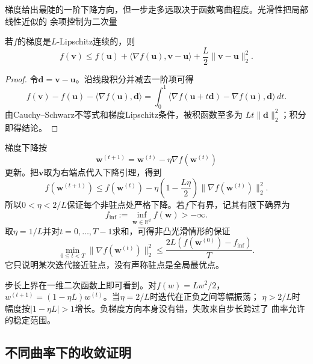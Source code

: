 梯度给出最陡的一阶下降方向，但一步走多远取决于函数弯曲程度。光滑性把局部线性近似的
余项控制为二次量

\begin{lemma}[下降引理]
\label{lem:opt-descent}
若$f$的梯度是$L$-Lipschitz连续的，则
\begin{equation}
  f(\bm{v})\leq f(\bm{u})
  +\langle\nabla f(\bm{u}),\bm{v}-\bm{u}\rangle
  +\frac{L}{2}\lVert\bm{v}-\bm{u}\rVert_2^2.
  \label{eq:opt-descent-lemma}
\end{equation}
\end{lemma}

\begin{proof}
令$\bm{d}=\bm{v}-\bm{u}$。沿线段积分并减去一阶项可得
\[
  f(\bm{v})-f(\bm{u})-\langle\nabla f(\bm{u}),\bm{d}\rangle
  =
  \int_0^1
  \langle\nabla f(\bm{u}+t\bm{d})-\nabla f(\bm{u}),\bm{d}\rangle\,dt.
\]
由Cauchy--Schwarz不等式和梯度Lipschitz条件，被积函数至多为
$Lt\lVert\bm{d}\rVert_2^2$；积分即得结论。
\end{proof}

梯度下降按
\begin{equation}
  \bm{w}^{(t+1)}
  =\bm{w}^{(t)}-\eta\nabla f(\bm{w}^{(t)})
  \label{eq:opt-gradient-descent}
\end{equation}
更新。把$\bm{v}$取为右端点代入下降引理，得到
\begin{equation}
  f(\bm{w}^{(t+1)})
  \leq f(\bm{w}^{(t)})
  -\eta\left(1-\frac{L\eta}{2}\right)
  \lVert\nabla f(\bm{w}^{(t)})\rVert_2^2.
  \label{eq:opt-gradient-single-step}
\end{equation}
所以$0<\eta<2/L$保证每个非驻点处严格下降。若$f$下有界，记其有限下确界为
\[
  f_{\inf}:=\inf_{\bm{w}\in\mathbb{R}^d}f(\bm{w})>-\infty.
\]
取$\eta=1/L$并对$t=0,\ldots,T-1$求和，可得非凸光滑情形的保证
\begin{equation}
  \min_{0\leq t<T}\lVert\nabla f(\bm{w}^{(t)})\rVert_2^2
  \leq
  \frac{2L(f(\bm{w}^{(0)})-f_{\inf})}{T}.
  \label{eq:opt-nonconvex-gradient-rate}
\end{equation}
它只说明某次迭代接近驻点，没有声称驻点是全局最优点。

步长上界在一维二次函数上即可看到。对$f(w)=Lw^2/2$，
$w^{(t+1)}=(1-\eta L)w^{(t)}$。当$\eta=2/L$时迭代在正负之间等幅振荡；
$\eta>2/L$时幅度按$|1-\eta L|>1$增长。负梯度方向本身没有错，失败来自步长跨过了
曲率允许的稳定范围。

\subsection{不同曲率下的收敛证明}

